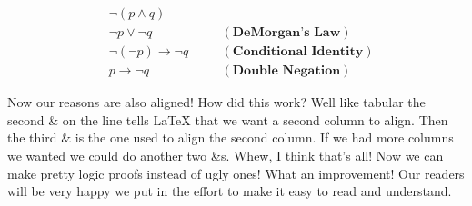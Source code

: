 \documentclass{article}
\begin{document}
    \setcounter{equation}{0}
    \begin{align}
        & \neg (p \land q) \\
        & \neg p \lor \neg q \quad & &(\textbf{DeMorgan's Law}) \\
        & \neg (\neg p) \rightarrow \neg q \quad & &(\textbf{Conditional Identity}) \\
        & p \rightarrow \neg q \quad & &(\textbf{Double Negation})
    \end{align}

\noindent Now our reasons are also aligned! How did this work? Well like tabular the second $\&$ on the line tells \LaTeX{} that we want a second column to align. Then the third $\&$ is the one used to align the second column. If we had more columns we wanted we could do another two \&s. Whew, I think that's all! Now we can make pretty logic proofs instead of ugly ones! What an improvement! Our readers will be very happy we put in the effort to make it easy to read and understand.
\end{document}
